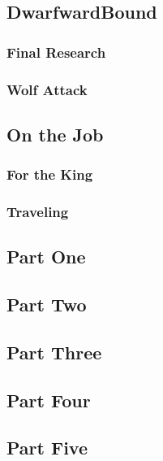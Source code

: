 

\subsection{DwarfwardBound}


\subsubsection{Final Research}


\subsubsection{Wolf Attack}


\subsection{On the Job}


\subsubsection{For the King}


\subsubsection{Traveling}


\subsection{Part One}


\subsection{Part Two}


\subsection{Part Three}


\subsection{Part Four}


\subsection{Part Five}

